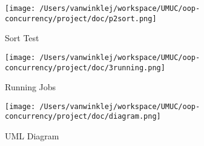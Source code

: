 \documentclass[english,floatsintext,man]{apa6}
\begin{document}
\begin{figure}[htbp]
\centering
\texttt{[image: /Users/vanwinklej/workspace/UMUC/oop-concurrency/project/doc/p2sort.png]}
\caption{Sort Test}
\end{figure}

\begin{figure}[htbp]
\centering
\texttt{[image: /Users/vanwinklej/workspace/UMUC/oop-concurrency/project/doc/3running.png]}
\caption{Running Jobs}
\end{figure}

\begin{figure}[htbp]
\centering
\texttt{[image: /Users/vanwinklej/workspace/UMUC/oop-concurrency/project/doc/diagram.png]}
\caption{UML Diagram}
\end{figure}

\setlength{\parindent}{-0.5in} \setlength{\leftskip}{0.5in}
\end{document}
